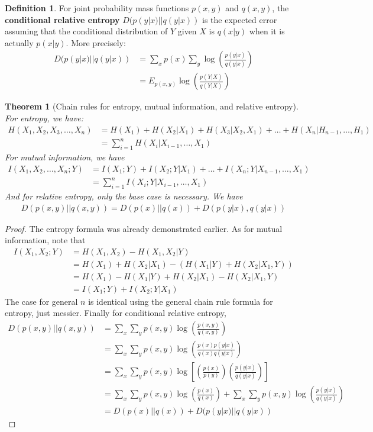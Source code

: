 \documentclass{article}
\theoremstyle{definition}
\newtheorem{definition}{Definition}[section]
\theoremstyle{plain}
\newtheorem{theorem}{Theorem}[section]
\begin{document}
\begin{definition}
	For joint probability mass functions $p(x,y)$ and $q(x,y)$, the \textbf{conditional relative entropy} $D(p(y|x)||q(y|x))$ is the expected error assuming that the conditional distribution of $Y$ given $X$ is $q(x|y)$ when it is actually $p(x|y)$. More precisely:
	\begin{align}
		D(p(y|x)||q(y|x)) &= \sum_x p(x) \sum_y \log\left( \frac{p(y|x)}{q(y|x)} \right) \\
		&= E_{p(x,y)} \log\left( \frac{p(Y|X)}{q(Y|X)} \right)
	\end{align}
\end{definition}
\begin{theorem}[Chain rules for entropy, mutual information, and relative entropy]
	For entropy, we have:
\begin{align}
	H(X_1,X_2,X_3,\ldots,X_n) &= H(X_1)+H(X_2|X_1)+H(X_3|X_2,X_1) +\ldots + H(X_n|H_{n-1},\ldots,H_1) \\
	&= \sum_{i=1}^n H(X_i|X_{i-1},\ldots,X_1)
\end{align}
	For mutual information, we have
\begin{align}
	I(X_1,X_2,\ldots,X_n;Y) &= I(X_1;Y)+I(X_2;Y|X_1)+\ldots + I(X_n;Y|X_{n-1},\ldots,X_1) \\
	&= \sum_{i=1}^n I(X_i;Y|X_{i-1},\ldots,X_1)
\end{align}
And for relative entropy, only the base case is necessary. We have
\begin{align}
	D(p(x,y)||q(x,y)) = D(p(x)||q(x))+D(p(y|x),q(y|x))
\end{align}
\end{theorem}
\begin{proof}
	The entropy formula was already demonstrated earlier. As for mutual information, note that
	\begin{align}
		I(X_1,X_2;Y) &= H(X_1,X_2) - H(X_1,X_2|Y) \\
			&= H(X_1)+H(X_2|X_1) - (H(X_1|Y)+H(X_2|X_1,Y)) \\
			&= H(X_1) - H(X_1|Y) + H(X_2|X_1) - H(X_2|X_1,Y) \\
			&= I(X_1;Y) + I(X_2;Y|X_1) 
	\end{align} 
The case for general $n$ is identical using the general chain rule formula for entropy, just messier. Finally for conditional relative entropy, 
\begin{align}
	D(p(x,y)||q(x,y)) &= \sum_x \sum_y p(x,y)\log\left( \frac{p(x,y)}{q(x,y)} \right) \\
	&= \sum_x \sum_y p(x,y)\log\left( \frac{p(x)p(y|x)}{q(x)q(y|x)} \right) \\
	&= \sum_x \sum_y p(x,y)\log\left[ \left( \frac{p(x)}{p(y)} \right) \left( \frac{p(y|x)}{q(y|x)} \right) \right] \\
	&= \sum_x \sum_y p(x,y)\log\left( \frac{p(x)}{q(x)} \right) + \sum_x \sum_y p(x,y) \log\left( \frac{p(y|x)}{q(y|x)} \right) \\
	&= D(p(x)||q(x)) + D(p(y|x)||q(y|x))
\end{align}
\end{proof}
\end{document}
